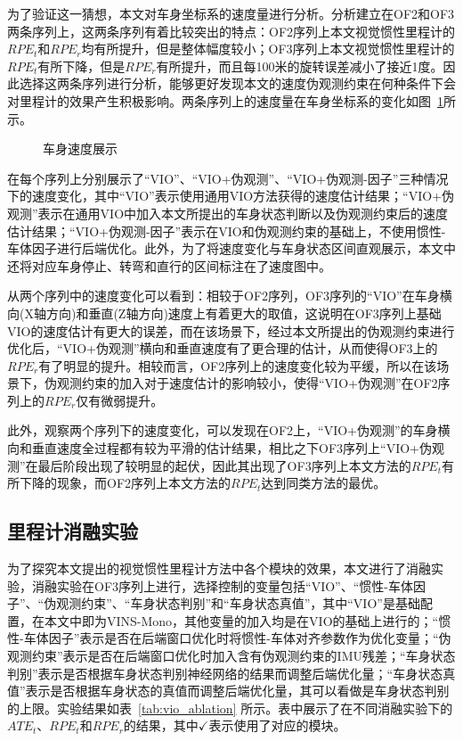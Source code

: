 为了验证这一猜想，本文对车身坐标系的速度量进行分析。分析建立在OF2和OF3两条序列上，这两条序列有着比较突出的特点：OF2序列上本文视觉惯性里程计的$RPE_t$和$RPE_r$均有所提升，但是整体幅度较小；OF3序列上本文视觉惯性里程计的$RPE_t$有所下降，但是$RPE_r$有所提升，而且每100米的旋转误差减小了接近1度。因此选择这两条序列进行分析，能够更好发现本文的速度伪观测约束在何种条件下会对里程计的效果产生积极影响。两条序列上的速度量在车身坐标系的变化如图~\ref{fig:VIO_velocity}所示。

\begin{figure}
  \centering
  \caption{车身速度展示}
  \label{fig:VIO_velocity}
\end{figure}

在每个序列上分别展示了“VIO”、“VIO+伪观测”、“VIO+伪观测-因子”三种情况下的速度变化，其中“VIO”表示使用通用VIO方法获得的速度估计结果；“VIO+伪观测”表示在通用VIO中加入本文所提出的车身状态判断以及伪观测约束后的速度估计结果；“VIO+伪观测-因子”表示在VIO和伪观测约束的基础上，不使用惯性-车体因子进行后端优化。此外，为了将速度变化与车身状态区间直观展示，本文中还将对应车身停止、转弯和直行的区间标注在了速度图中。

从两个序列中的速度变化可以看到：相较于OF2序列，OF3序列的“VIO”在车身横向(X轴方向)和垂直(Z轴方向)速度上有着更大的取值，这说明在OF3序列上基础VIO的速度估计有更大的误差，而在该场景下，经过本文所提出的伪观测约束进行优化后，“VIO+伪观测”横向和垂直速度有了更合理的估计，从而使得OF3上的$RPE_r$有了明显的提升。相较而言，OF2序列上的速度变化较为平缓，所以在该场景下，伪观测约束的加入对于速度估计的影响较小，使得“VIO+伪观测”在OF2序列上的$RPE_r$仅有微弱提升。

此外，观察两个序列下的速度变化，可以发现在OF2上，“VIO+伪观测”的车身横向和垂直速度全过程都有较为平滑的估计结果，相比之下OF3序列上“VIO+伪观测”在最后阶段出现了较明显的起伏，因此其出现了OF3序列上本文方法的$RPE_t$有所下降的现象，而OF2序列上本文方法的$RPE_t$达到同类方法的最优。


\subsection{里程计消融实验}
为了探究本文提出的视觉惯性里程计方法中各个模块的效果，本文进行了消融实验，消融实验在OF3序列上进行，选择控制的变量包括“VIO”、“惯性-车体因子”、“伪观测约束”、“车身状态判别”和“车身状态真值”，其中“VIO”是基础配置，在本文中即为VINS-Mono，其他变量的加入均是在VIO的基础上进行的；“惯性-车体因子”表示是否在后端窗口优化时将惯性-车体对齐参数作为优化变量；“伪观测约束”表示是否在后端窗口优化时加入含有伪观测约束的IMU残差；“车身状态判别”表示是否根据车身状态判别神经网络的结果而调整后端优化量；“车身状态真值”表示是否根据车身状态的真值而调整后端优化量，其可以看做是车身状态判别的上限。实验结果如表~\ref{tab:vio_ablation} 所示。表中展示了在不同消融实验下的$ATE_t$、$RPE_t$和$RPE_r$的结果，其中$\checkmark$表示使用了对应的模块。

